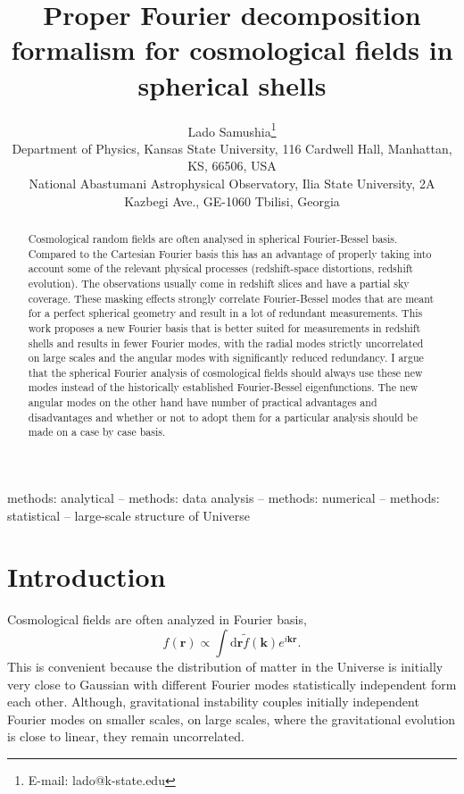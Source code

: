 \documentclass[fleqn,usenatbib]{mnras}
\title[Basis for spherical shells]{Proper Fourier decomposition formalism for
cosmological fields in spherical shells}
\author[Lado Samushia]{
Lado Samushia\thanks{E-mail: lado@k-state.edu}
\\
Department of Physics, Kansas State University, 116 Cardwell Hall,
Manhattan, KS, 66506, USA\\
National Abastumani Astrophysical Observatory, Ilia State University,
2A Kazbegi Ave., GE-1060 Tbilisi, Georgia\\
}
\begin{document}
\label{firstpage}
\pagerange{\pageref{firstpage}--\pageref{lastpage}}
\maketitle

\begin{abstract}
Cosmological random fields are often analysed in spherical Fourier-Bessel
basis. Compared to the Cartesian Fourier basis this has an advantage of
properly taking into account some of the relevant physical processes
(redshift-space distortions, redshift evolution). The observations usually come
in redshift slices and have a partial sky coverage. These masking effects
strongly correlate Fourier-Bessel modes that are meant for a perfect spherical
geometry and result in a lot of redundant measurements. This work proposes a
new Fourier basis that is better suited for measurements in redshift shells and
results in fewer Fourier modes, with the radial modes strictly uncorrelated on
large scales and the angular modes with significantly reduced redundancy. I
argue that the spherical Fourier analysis of cosmological fields should always
use these new modes instead of the historically established Fourier-Bessel
eigenfunctions. The new angular modes on the other hand have number of
practical advantages and disadvantages and whether or not to adopt them for a
particular analysis should be made on a case by case basis.
\end{abstract}

\begin{keywords}
methods: analytical -- methods: data analysis -- methods: numerical -- methods:
statistical -- large-scale structure of Universe
\end{keywords}



\section{Introduction}

Cosmological fields are often analyzed in Fourier basis, 
\begin{equation}
\label{eq:Finfinity}
f(\bm{r})\propto \displaystyle\int\!\!\mathrm{d}\bm{r}
\tilde{f}(\bm{k})e^{i\bm{k}\bm{r}}.
\end{equation}
\noindent
This is convenient because the distribution of matter in the Universe is
initially very close to Gaussian with different Fourier modes statistically
independent form each other. Although, gravitational instability couples
initially independent Fourier modes on smaller scales, on large scales, where
the gravitational evolution is close to linear, they remain uncorrelated.
\end{document}

